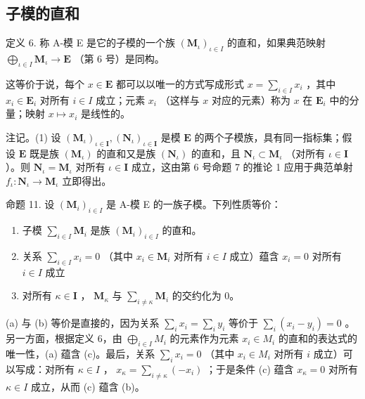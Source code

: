 \subsection{子模的直和}

定义 6. 称 A-模 E 是它的子模的一个族 \((\mathbf{M}_{\iota})_{\iota \in I}\) 的直和，如果典范映射 \(\bigoplus_{\iota \in I} \mathbf{M}_{\iota} \to \mathbf{E}\) （第 6 号）是同构。

这等价于说，每个 \(x \in \mathbf{E}\) 都可以以唯一的方式写成形式 \(x = \sum_{i \in I} x_i\) ，其中 \(x_i \in \mathbf{E}_i\) 对所有 \(i \in I\) 成立；元素 \(x_i\) （这样与 \(x\) 对应的元素）称为 \(x\) 在 \(\mathbf{E}_i\) 中的分量；映射 \(x \mapsto x_i\) 是线性的。

注记。(1) 设 \((\mathbf{M}_{\iota})_{\iota \in \mathbf{I}}, (\mathbf{N}_{\iota})_{\iota \in \mathbf{I}}\) 是模 \(\mathbf{E}\) 的两个子模族，具有同一指标集；假设 \(\mathbf{E}\) 既是族 \((\mathbf{M}_{\iota})\) 的直和又是族 \((\mathbf{N}_{\iota})\) 的直和，且 \(\mathbf{N}_{\iota} \subset \mathbf{M}_{\iota}\) （对所有 \(\iota \in \mathbf{I}\) ）。则 \(\mathbf{N}_{\iota} = \mathbf{M}_{\iota}\) 对所有 \(\iota \in \mathbf{I}\) 成立，这由第 6 号命题 7 的推论 1 应用于典范单射 \(f_{\iota}: \mathbf{N}_{\iota} \to \mathbf{M}_{\iota}\) 立即得出。

命题 11. 设 \((\mathbf{M}_{i})_{i\in I}\) 是 A-模 E 的一族子模。下列性质等价：

\begin{enumerate}
\def\labelenumi{(\alph{enumi})}
\item
  子模 \(\sum_{i\in I}\mathbf{M}_i\) 是族 \((\mathbf{M}_i)_{i\in I}\) 的直和。
\item
  关系 \(\sum_{i\in I}x_i = 0\) （其中 \(x_{i}\in \mathbf{M}_{i}\) 对所有 \(i\in I\) 成立）蕴含 \(x_{i} = 0\) 对所有 \(i\in I\) 成立
\item
  对所有 \(\kappa \in \mathbf{I}\) ， \(\mathbf{M}_{\kappa}\) 与 \(\sum_{i \neq \kappa} \mathbf{M}_i\) 的交约化为 0。
\end{enumerate}

(a) 与 (b) 等价是直接的，因为关系 \(\sum_{i} x_{i} = \sum_{i} y_{i}\) 等价于 \(\sum_{i} (x_{i} - y_{i}) = 0\) 。另一方面，根据定义 6，由 \(\bigoplus_{i \in I} M_{i}\) 的元素作为元素 \(x_{i} \in M_{i}\) 的直和的表达式的唯一性，(a) 蕴含 (c)。最后，关系 \(\sum_{i} x_{i} = 0\) （其中 \(x_{i} \in M_{i}\) 对所有 \(i\) 成立）可以写成：对所有 \(\kappa \in I\) ， \(x_{\kappa} = \sum_{i \neq \kappa} (-x_{i})\) ；于是条件 (c) 蕴含 \(x_{\kappa} = 0\) 对所有 \(\kappa \in I\) 成立，从而 (c) 蕴含 (b)。


